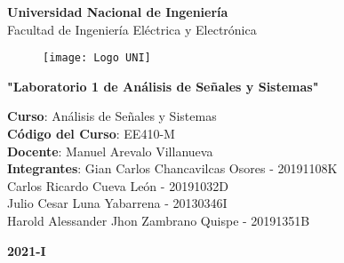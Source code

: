 \begin{titlepage}%
	\begin{center}
	 {\huge \textbf{Universidad Nacional de Ingeniería}}\\
	 \vspace{3mm}
	  {\Large {Facultad de Ingeniería Eléctrica y Electrónica}}\\
	\vspace{1mm}
	 \begin{figure}[h]
	 	\centering 
	 \texttt{[image: Logo UNI]}
	 \end{figure}
	 \vspace{-6mm}
	{\Large \textbf{"Laboratorio 1 de Análisis de Señales y Sistemas"}}\\
	\vspace{8mm}
	\begin{flushleft}
	{\Large {\textbf{Curso}: Análisis de Señales y Sistemas}}\\
	\vspace{8mm}		
	{\Large {\textbf{Código del Curso}: EE410-M}}\\	
	\vspace{8mm}	
	{\Large {\textbf{Docente}: Manuel Arevalo Villanueva}}\\
	\vspace{8mm}	
	{\Large {\textbf{Integrantes}: 
	Gian Carlos Chancavilcas Osores - 20191108K\\
	\vspace{4mm}
	\hspace{3cm}Carlos Ricardo Cueva León - 20191032D\\ 
	\vspace{4mm}
	\hspace{3cm}Julio Cesar Luna Yabarrena - 20130346I\\ 
	\vspace{4mm}
	\hspace{3cm}Harold Alessander Jhon Zambrano Quispe - 20191351B}}\\
	\vspace{8mm}	
	\end{flushleft}
	\vspace{10mm}
	{\Huge {\textbf{2021-I}}}\\
	\end{center}
\end{titlepage}
